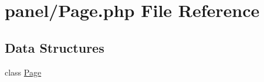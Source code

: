 \hypertarget{_page_8php}{}\section{panel/\+Page.php File Reference}
\label{_page_8php}
\subsection*{Data Structures}
\begin{DoxyCompactItemize}
\item 
class \hyperlink{class_page}{Page}
\end{DoxyCompactItemize}
